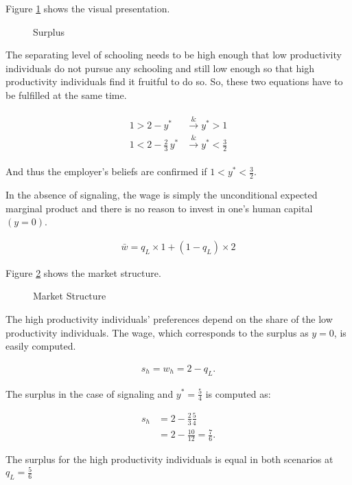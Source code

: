 \begin{boenumerate}
Figure \ref{Surplus} shows the visual presentation.

\begin{figure}[h]\centering
\caption{Surplus}\label{Surplus}
\end{figure}

\item The separating level of schooling needs to be high enough that low productivity individuals do not pursue any schooling and still low enough so that high productivity individuals find it fruitful to do so. So, these two equations have to be fulfilled at the same time.

\begin{align*}\begin{array}{lll}
1  > 2 - y^*        &\xrightarrow &  y^* > 1 \\
1  < 2 - \frac{2}{3}\, y^* &\xrightarrow &  y^* < \frac{3}{2}
\end{array}
\end{align*}

And thus the employer's beliefs are confirmed if $1 < y^* < \tfrac{3}{2}$.

\item In the absence of signaling, the wage is simply the unconditional expected marginal product and there is no reason to invest in one's human capital $(y = 0)$.

\begin{align*}
\bar{w} = q_L \times 1 + (1 - q_L) \times 2
\end{align*}

\item Figure \ref{Market Structure} shows the market structure.

\begin{figure}[h]\centering
\caption{Market Structure}\label{Market Structure}
\end{figure}

\item The high productivity individuals' preferences depend on the share of the low productivity individuals. The wage, which corresponds to the surplus as $y = 0$, is easily computed.

\begin{align*}
s_h = w_h = 2 - q_L.
\end{align*}

The surplus in the case of signaling and $y^* = \frac{5}{4}$ is computed as:

\begin{align*}
s_h & = 2 - \frac{2}{3}\frac{5}{4} \\
    & = 2 - \frac{10}{12} = \frac{7}{6}.
\end{align*}

The surplus for the high productivity individuals is equal in both scenarios at $q_L = \frac{5}{6}$

\end{boenumerate}

